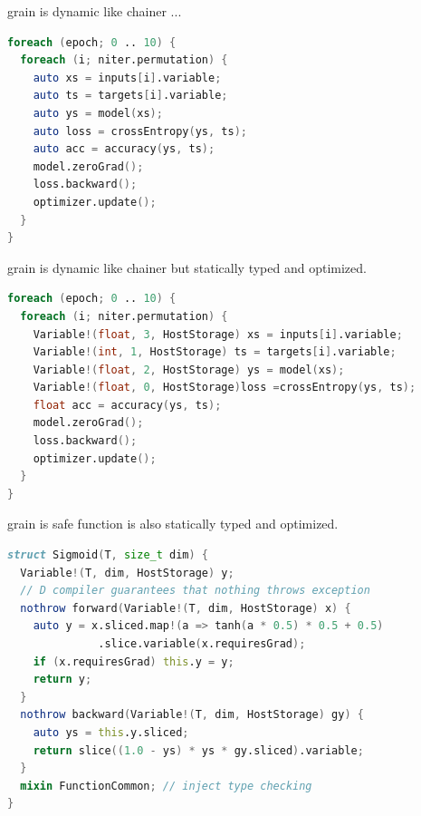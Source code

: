 \documentclass[aspectratio=169,
  14pt,xcolor=dvipsnames,table,professional font,dvipdfmx]{beamer}
\begin{document}
\begin{frame}[fragile]{grain is \alert{dynamic}}
like chainer ...
  \begin{lstlisting}[language=D]
foreach (epoch; 0 .. 10) {
  foreach (i; niter.permutation) {
    auto xs = inputs[i].variable;
    auto ts = targets[i].variable;
    auto ys = model(xs);
    auto loss = crossEntropy(ys, ts);
    auto acc = accuracy(ys, ts);
    model.zeroGrad();
    loss.backward();
    optimizer.update();
  }
}\end{lstlisting}
\end{frame}

\begin{frame}[fragile]{grain is \alert{dynamic}}
like chainer \alert{but statically typed and optimized.}
  \begin{lstlisting}[language=D,basicstyle=\footnotesize\ttfamily]
foreach (epoch; 0 .. 10) {
  foreach (i; niter.permutation) {
    Variable!(float, 3, HostStorage) xs = inputs[i].variable;
    Variable!(int, 1, HostStorage) ts = targets[i].variable;
    Variable!(float, 2, HostStorage) ys = model(xs);
    Variable!(float, 0, HostStorage)loss =crossEntropy(ys, ts);
    float acc = accuracy(ys, ts);
    model.zeroGrad();
    loss.backward();
    optimizer.update();
  }
}\end{lstlisting}
\end{frame}

\begin{frame}[fragile]{grain is \alert{safe}}
  \alert{function} is also statically typed and optimized.
  \begin{lstlisting}[language=D,basicstyle=\footnotesize\ttfamily]
struct Sigmoid(T, size_t dim) {
  Variable!(T, dim, HostStorage) y;
  // D compiler guarantees that nothing throws exception
  nothrow forward(Variable!(T, dim, HostStorage) x) {
    auto y = x.sliced.map!(a => tanh(a * 0.5) * 0.5 + 0.5)
              .slice.variable(x.requiresGrad);
    if (x.requiresGrad) this.y = y;
    return y;
  }
  nothrow backward(Variable!(T, dim, HostStorage) gy) {
    auto ys = this.y.sliced;
    return slice((1.0 - ys) * ys * gy.sliced).variable;
  }
  mixin FunctionCommon; // inject type checking
}\end{lstlisting}
\end{frame}
\end{document}
